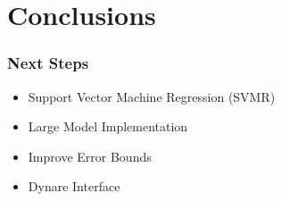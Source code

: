 \documentclass[notheorems]{beamer}
\begin{document}
\section{Conclusions}
\label{sec:conclusions}


\begin{frame}
  \frametitle{Next Steps}
\begin{itemize}
\item Support Vector Machine Regression (SVMR)
\item Large Model Implementation
\item Improve Error Bounds
\item Dynare Interface
\end{itemize}

\end{frame}





\end{document}
